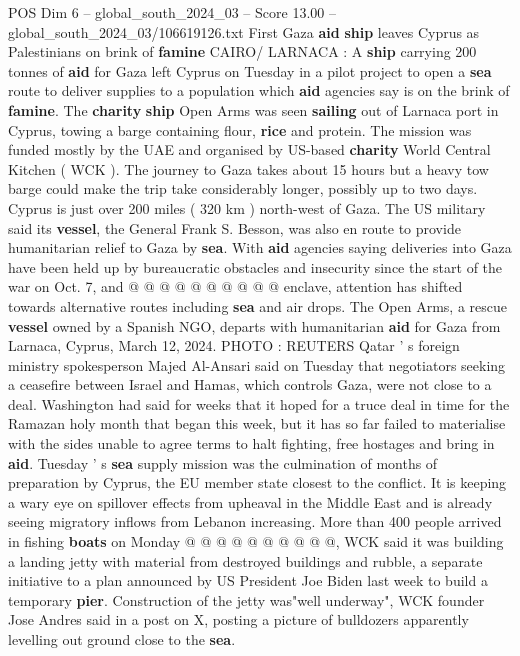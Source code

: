 \begin{textsample}{POS Dim 6 – global\_south\_2024\_03 – Score 13.00 – global\_south\_2024\_03/106619126.txt}  \label{ex:f6_pos_034}
First Gaza \textbf{aid} \textbf{ship} leaves Cyprus as Palestinians on brink of \textbf{famine} CAIRO/ LARNACA : A \textbf{ship} carrying 200 tonnes of \textbf{aid} for Gaza left Cyprus on Tuesday in a pilot project to open a \textbf{sea} route to deliver supplies to a population which \textbf{aid} agencies say is on the brink of \textbf{famine}.
The \textbf{charity} \textbf{ship} Open Arms was seen \textbf{sailing} out of Larnaca port in Cyprus, towing a barge containing flour, \textbf{rice} and protein.
The mission was funded mostly by the UAE and organised by US-based \textbf{charity} World Central Kitchen ( WCK ).
The journey to Gaza takes about 15 hours but a heavy tow barge could make the trip take considerably longer, possibly up to two days.
Cyprus is just over 200 miles ( 320 km ) north-west of Gaza.
The US military said its \textbf{vessel}, the General Frank S.
Besson, was also en route to provide humanitarian relief to Gaza by \textbf{sea}.
With \textbf{aid} agencies saying deliveries into Gaza have been held up by bureaucratic obstacles and insecurity since the start of the war on Oct. 7, and @ @ @ @ @ @ @ @ @ @ enclave, attention has shifted towards alternative routes including \textbf{sea} and air drops.
The Open Arms, a rescue \textbf{vessel} owned by a Spanish NGO, departs with humanitarian \textbf{aid} for Gaza from Larnaca, Cyprus, March 12, 2024.
PHOTO : REUTERS Qatar ' s foreign ministry spokesperson Majed Al-Ansari said on Tuesday that negotiators seeking a ceasefire between Israel and Hamas, which controls Gaza, were not close to a deal.
Washington had said for weeks that it hoped for a truce deal in time for the Ramazan holy month that began this week, but it has so far failed to materialise with the sides unable to agree terms to halt fighting, free hostages and bring in \textbf{aid}.
Tuesday ' s \textbf{sea} supply mission was the culmination of months of preparation by Cyprus, the EU member state closest to the conflict.
It is keeping a wary eye on spillover effects from upheaval in the Middle East and is already seeing migratory inflows from Lebanon increasing.
More than 400 people arrived in fishing \textbf{boats} on Monday @ @ @ @ @ @ @ @ @ @, WCK said it was building a landing jetty with material from destroyed buildings and rubble, a separate initiative to a plan announced by US President Joe Biden last week to build a temporary \textbf{pier}.
Construction of the jetty was"well underway", WCK founder Jose Andres said in a post on X, posting a picture of bulldozers apparently levelling out ground close to the \textbf{sea}.

\end{textsample}
